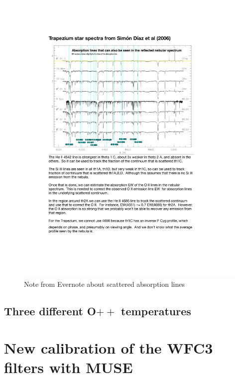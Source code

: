 \documentclass[preprint]{aastex}
\begin{document}
\begin{figure}
  \includegraphics[trim=50 50 50 50, width=\textwidth]{evernote-trap-spectrum}
  \caption{Note from Evernote about scattered absorption lines}
  \label{fig:abs-lines-evernote}
\end{figure}


\subsection{Three different O\(++\) temperatures}
\label{sec:three-different-o++}





\clearpage
\appendix
\section{New calibration of the WFC3 filters with MUSE}
\label{sec:muse-calib}
\citep{Weilbacher:2015a}


\newcommand\calibplot[1]{\texttt{[image: wfc3-vs-muse-calib-\#1]}}
\end{document}
